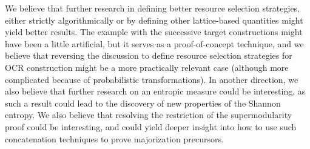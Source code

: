 We believe that further research in defining better resource selection strategies, either strictly algorithmically or by defining other lattice-based quantities might yield better results. The example with the successive target constructions might have been a little artificial, but it serves as a proof-of-concept technique, and we believe that reversing the discussion to define resource selection strategies for OCR construction might be a more practically relevant case (although more complicated because of probabilistic transformations). In another direction, we also believe that further research on an entropic measure could be interesting, as such a result could lead to the discovery of new properties of the Shannon entropy. We also believe that resolving the restriction of the supermodularity proof could be interesting, and could yield deeper insight into how to use such concatenation techniques to prove majorization precursors.